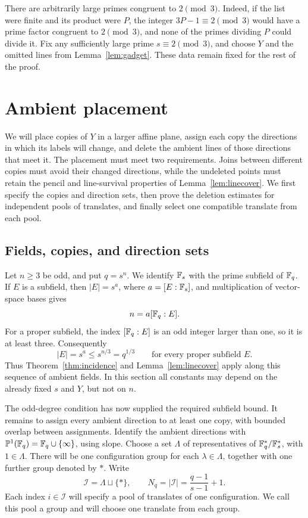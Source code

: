 There are arbitrarily large primes congruent to \(2\pmod3\).  Indeed,
if the list were finite and its product were \(P\), the integer
\(3P-1\equiv2\pmod3\) would have a prime factor congruent to
\(2\pmod3\), and none of the primes dividing \(P\) could divide it.
Fix any sufficiently large prime \(s\equiv2\pmod3\), and choose
\(Y\) and the omitted lines from Lemma~\ref{lem:gadget}.
These data remain fixed for the rest of the proof.

\section{Ambient placement}
\label{sec:placement}

We will place copies of \(Y\) in a larger affine plane, assign each
copy the directions in which its labels will change, and delete the
ambient lines of those directions that meet it.  The placement must
meet two requirements.  Joins between different copies must avoid
their changed directions, while the undeleted points must retain the
pencil and line-survival properties of Lemma~\ref{lem:linecover}.
We first specify the copies and direction sets, then prove the
deletion estimates for independent pools of translates, and finally
select one compatible translate from each pool.

\subsection{Fields, copies, and direction sets}

Let \(n\ge3\) be odd, and put \(q=s^n\). We identify \(\mathbb F_s\)
with the prime subfield of \(\mathbb F_q\). If \(E\) is a subfield, then
\(|E|=s^a\), where \(a=[E:\mathbb F_s]\), and multiplication of vector-space
bases gives
\[
 n=a[\mathbb F_q:E].
\]
For a proper subfield, the index \([\mathbb F_q:E]\) is an odd integer
larger than one, so it is at least three. Consequently
\[
 |E|=s^a\le s^{n/3}=q^{1/3}
 \qquad\text{for every proper subfield }E.
\]
Thus Theorem~\ref{thm:incidence} and
Lemma~\ref{lem:linecover} apply along this sequence of ambient
fields.  In this section all constants may depend on the already
fixed \(s\) and \(Y\), but not on \(n\).

The odd-degree condition has now supplied the required subfield bound.
It remains to assign every ambient direction to at least one copy,
with bounded overlap between assignments.  Identify the ambient
directions with
\(\mathbb P^1(\mathbb F_q)=\mathbb F_q\cup\{\infty\}\), using slope.  Choose a
set \(\Lambda\) of representatives of
\(\mathbb F_q^*/\mathbb F_s^*\), with \(1\in\Lambda\).  There will be one
configuration group for each \(\lambda\in\Lambda\), together
with one further group denoted by \(*\).  Write
\[
 \mathcal I=\Lambda\sqcup\{*\},
 \qquad N_q=|\mathcal I|=\frac{q-1}{s-1}+1.
\]
Each index \(i\in\mathcal I\) will specify a pool of translates
of one configuration.  We call this pool a group and will choose one
translate from each group.

